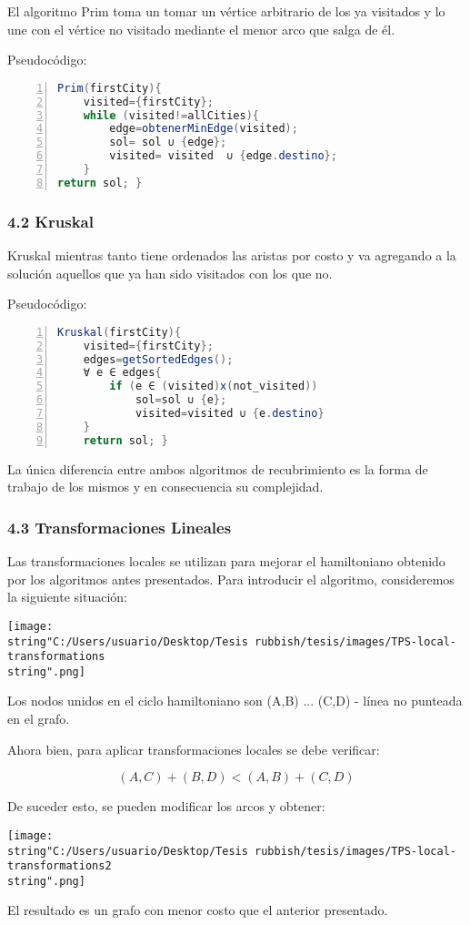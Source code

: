 El algoritmo Prim toma un tomar un vértice arbitrario de los ya visitados
y lo une con el vértice no visitado mediante el menor arco que salga
de él.

Pseudocódigo:

\begin{lstlisting}[language=Java,numbers=left,numberstyle={\tiny},basicstyle={\footnotesize},breaklines=true,captionpos=t,frame=no,keywordstyle={\color{blue}},commentstyle={\color{gray}},stringstyle={\color{red}},numbersep=5pt,emph={label}]
Prim(firstCity){ 	
	visited={firstCity}; 	
	while (visited!=allCities){ 		
		edge=obtenerMinEdge(visited); 		
		sol= sol ∪ {edge}; 		
		visited= visited  ∪ {edge.destino};
	} 	
return sol; }
\end{lstlisting}



\subsubsection*{4.2 Kruskal}

Kruskal mientras tanto tiene ordenados las aristas por costo y va
agregando a la solución aquellos que ya han sido visitados con los
que no.

Pseudocódigo:

\begin{lstlisting}[language=Java,numbers=left,numberstyle={\tiny},basicstyle={\footnotesize},breaklines=true,captionpos=t,frame=no,keywordstyle={\color{blue}},commentstyle={\color{gray}},stringstyle={\color{red}},numbersep=5pt,emph={label}]
Kruskal(firstCity){ 	
	visited={firstCity}; 	
	edges=getSortedEdges(); 	
	∀ e ∈ edges{ 		
		if (e ∈ (visited)x(not_visited)) 			
			sol=sol ∪ {e}; 			
			visited=visited ∪ {e.destino} 		
	} 
	return sol; }
\end{lstlisting}


La única diferencia entre ambos algoritmos de recubrimiento es la
forma de trabajo de los mismos y en consecuencia su complejidad.


\subsubsection*{4.3 Transformaciones Lineales}

Las transformaciones locales se utilizan para mejorar el hamiltoniano
obtenido por los algoritmos antes presentados. Para introducir el
algoritmo, consideremos la siguiente situación:

\texttt{[image: \\string"C:/Users/usuario/Desktop/Tesis rubbish/tesis/images/TPS-local-transformations\\string".png]}

Los nodos unidos en el ciclo hamiltoniano son (A,B) ... (C,D) - línea
no punteada en el grafo. 

Ahora bien, para aplicar transformaciones locales se debe verificar: 

\[
(A,C)+(B,D)<(A,B)+(C,D)
\]


De suceder esto, se pueden modificar los arcos y obtener:

\texttt{[image: \\string"C:/Users/usuario/Desktop/Tesis rubbish/tesis/images/TPS-local-transformations2\\string".png]}

El resultado es un grafo con menor costo que el anterior presentado.
